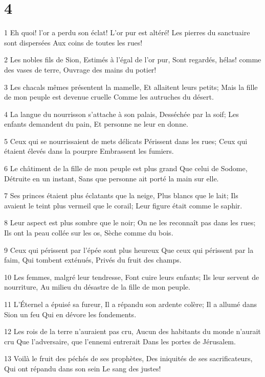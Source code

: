 \chapter{4}

\par 1 Eh quoi! l'or a perdu son éclat! L'or pur est altéré! Les pierres du sanctuaire sont dispersées Aux coins de toutes les rues!
\par 2 Les nobles fils de Sion, Estimés à l'égal de l'or pur, Sont regardés, hélas! comme des vases de terre, Ouvrage des mains du potier!
\par 3 Les chacals mêmes présentent la mamelle, Et allaitent leurs petits; Mais la fille de mon peuple est devenue cruelle Comme les autruches du désert.
\par 4 La langue du nourrisson s'attache à son palais, Desséchée par la soif; Les enfants demandent du pain, Et personne ne leur en donne.
\par 5 Ceux qui se nourrissaient de mets délicats Périssent dans les rues; Ceux qui étaient élevés dans la pourpre Embrassent les fumiers.
\par 6 Le châtiment de la fille de mon peuple est plus grand Que celui de Sodome, Détruite en un instant, Sans que personne ait porté la main sur elle.
\par 7 Ses princes étaient plus éclatants que la neige, Plus blancs que le lait; Ils avaient le teint plus vermeil que le corail; Leur figure était comme le saphir.
\par 8 Leur aspect est plus sombre que le noir; On ne les reconnaît pas dans les rues; Ils ont la peau collée sur les os, Sèche comme du bois.
\par 9 Ceux qui périssent par l'épée sont plus heureux Que ceux qui périssent par la faim, Qui tombent exténués, Privés du fruit des champs.
\par 10 Les femmes, malgré leur tendresse, Font cuire leurs enfants; Ils leur servent de nourriture, Au milieu du désastre de la fille de mon peuple.
\par 11 L'Éternel a épuisé sa fureur, Il a répandu son ardente colère; Il a allumé dans Sion un feu Qui en dévore les fondements.
\par 12 Les rois de la terre n'auraient pas cru, Aucun des habitants du monde n'aurait cru Que l'adversaire, que l'ennemi entrerait Dans les portes de Jérusalem.
\par 13 Voilà le fruit des péchés de ses prophètes, Des iniquités de ses sacrificateurs, Qui ont répandu dans son sein Le sang des justes!
